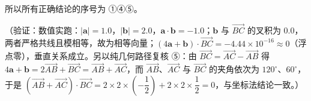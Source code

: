 \begin{answer}
所以所有正确结论的序号为 ①④⑤。

（验证：数值实跑：\(|\boldsymbol{a}|=1.0\)，\(|\boldsymbol{b}|=2.0\)，\(\boldsymbol{a}\cdot\boldsymbol{b}=-1.0\)；\(\boldsymbol{b}\) 与 \(\overrightarrow{BC}\) 的叉积为 \(0.0\)，两者严格共线且模相等，故为相等向量；\((4\boldsymbol{a}+\boldsymbol{b})\cdot\overrightarrow{BC}=-4.44\times10^{-16}\approx0\)（浮点零），垂直关系成立。另以纯几何路径复核 ⑤：由 \(\overrightarrow{BC}=\overrightarrow{AC}-\overrightarrow{AB}\) 得 \(4\boldsymbol{a}+\boldsymbol{b}=2\overrightarrow{AB}+\overrightarrow{BC}=\overrightarrow{AB}+\overrightarrow{AC}\)，而 \(\overrightarrow{AB}\)、\(\overrightarrow{AC}\) 与 \(\overrightarrow{BC}\) 的夹角依次为 \(120^{\circ}\)、\(60^{\circ}\)，于是 \((\overrightarrow{AB}+\overrightarrow{AC})\cdot\overrightarrow{BC}=2\times2\times\left(-\dfrac{1}{2}\right)+2\times2\times\dfrac{1}{2}=0\)，与坐标法结论一致。）


\end{answer}
